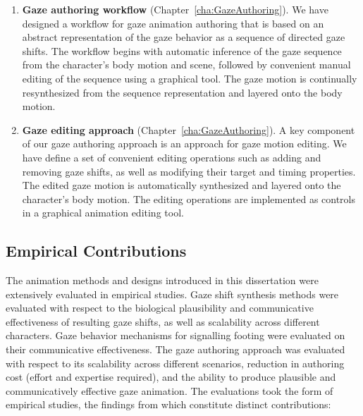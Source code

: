 \begin{enumerate}
\item \textbf{Gaze authoring workflow} (Chapter~\ref{cha:GazeAuthoring}). We have designed a workflow for gaze animation authoring that is based on an abstract representation of the gaze behavior as a sequence of directed gaze shifts. The workflow begins with automatic inference of the gaze sequence from the character's body motion and scene, followed by convenient manual editing of the sequence using a graphical tool. The gaze motion is continually resynthesized from the sequence representation and layered onto the body motion.
\item \textbf{Gaze editing approach} (Chapter~\ref{cha:GazeAuthoring}). A key component of our gaze authoring approach is an approach for gaze motion editing. We have define a set of convenient editing operations such as adding and removing gaze shifts, as well as modifying their target and timing properties. The edited gaze motion is automatically synthesized and layered onto the character's body motion. The editing operations are implemented as controls in a graphical animation editing tool.
\end{enumerate}

\subsection{Empirical Contributions}

The animation methods and designs introduced in this dissertation were extensively evaluated in empirical studies. Gaze shift synthesis methods were evaluated with respect to the biological plausibility and communicative effectiveness of resulting gaze shifts, as well as scalability across different characters. Gaze behavior mechanisms for signalling footing were evaluated on their communicative effectiveness. The gaze authoring approach was evaluated with respect to its scalability across different scenarios, reduction in authoring cost (effort and expertise required), and the ability to produce plausible and communicatively effective gaze animation. The evaluations took the form of empirical studies, the findings from which constitute distinct contributions:

